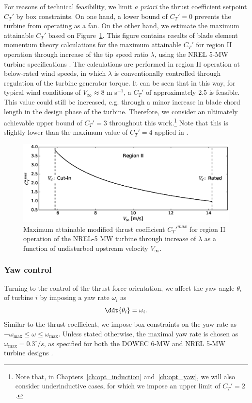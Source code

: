 For reasons of technical feasibility, we limit \emph{a priori} the thrust coefficient setpoint $C_T'$ by box constraints. On one hand, a lower bound of $C_T' = 0$ prevents the turbine from operating as a fan. On the other hand, we estimate the maximum attainable $C_T'$ based on Figure~\ref{fig:Ct_Uinfty}. This figure contains results of blade element momentum theory calculations for the maximum attainable $C_T'$ for region II operation through increase of the tip speed ratio $\lambda$, using the NREL 5-MW turbine specifications \citep{jonkman2009definition}. The calculations are performed in region II operation at below-rated wind speeds, in which $\lambda$ is conventionally controlled through regulation of the turbine generator torque. It can be seen that in this way, for typical wind conditions of $V_\infty \approx 8$ m s$^{-1}$, a $C_T'$ of approximately 2.5 is feasible. This value could still be increased, e.g. through a minor increase in blade chord length in the design phase of the turbine. Therefore, we consider an ultimately achievable upper bound of $C_T' = 3$ throughout this work.\footnote{Note that, in Chapters~\ref{ch:opt_induction} and~\ref{ch:opt_yaw}, we will also consider underinductive cases, for which we impose an upper limit of  $C_T' = 2$.} Note that this is slightly lower than the maximum value of $C_T' = 4$ applied in \cite{goit2015optimal}.

\begin{figure}
	\centering
	\includegraphics[width=0.9\linewidth]{chapters/methodology/figure7.eps} 	
	\caption{Maximum attainable modified thrust coefficient $C_T'^{max}$ for region II operation of the NREL-5 MW turbine through increase of $\lambda$ as a function of undisturbed upstream velocity $V_\infty$.}\label{fig:Ct_Uinfty}
\end{figure}

\subsubsection{Yaw control}
Turning to the control of the thrust force orientation, we affect the yaw angle $\theta_i$ of turbine $i$ by imposing a yaw rate $\omega_i$ as 
\begin{equation}
\ddt{\theta_i} = \omega_i \label{eq:omega_def}.
\end{equation}
Similar to the thrust coefficient, we impose box constraints on the yaw rate as $-\omega_{\text{max}} \leq \omega \leq \omega_{\text{max}}$. Unless stated otherwise, the maximal yaw rate is chosen as $\omega_{\text{max}} = 0.3^\circ/s$, as specified for both the DOWEC 6-MW and NREL 5-MW turbine designs \citep{Kooijman2003, jonkman2009definition}.

